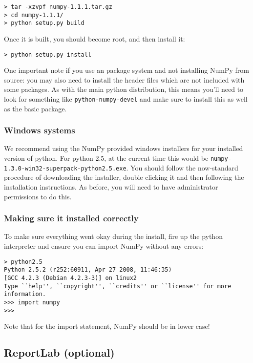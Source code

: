 \documentclass{article}
\begin{document}
\begin{verbatim}
> tar -xzvpf numpy-1.1.1.tar.gz
> cd numpy-1.1.1/
> python setup.py build
\end{verbatim}

Once it is built, you should become root, and then install it:

\begin{verbatim}
> python setup.py install
\end{verbatim}

One important note if you use an package system and not installing
NumPy from source: you may also need to
install the header files which are not included with some
packages. As with the main python distribution, this means
you'll need to look for something like \verb|python-numpy-devel| 
and make sure to install this as well as the basic package.

\subsubsection{Windows systems}

We recommend using the NumPy provided windows installers for your installed
version of python. For python 2.5, at the current time this would be
\verb|numpy-1.3.0-win32-superpack-python2.5.exe|. You should follow the 
now-standard procedure of downloading the installer, double
clicking it and then following the installation instructions. As before,
you will need to have administrator permissions to do this.

\subsubsection{Making sure it installed correctly}

To make sure everything went okay during the install, fire up the python
interpreter and ensure you can import NumPy without any errors:

\begin{verbatim}
> python2.5
Python 2.5.2 (r252:60911, Apr 27 2008, 11:46:35) 
[GCC 4.2.3 (Debian 4.2.3-3)] on linux2
Type ``help'', ``copyright'', ``credits'' or ``license'' for more information.
>>> import numpy
>>>
\end{verbatim}

Note that for the import statement, NumPy should be in lower case!

\subsection{ReportLab (optional)}
\end{document}
